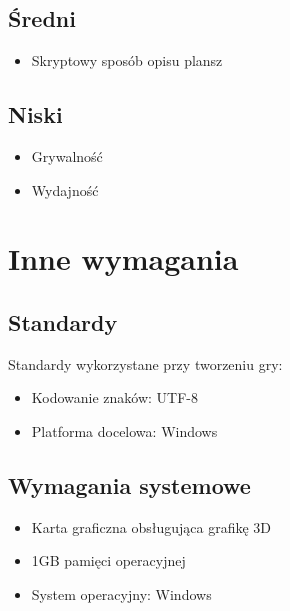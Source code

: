 \documentclass[12pt,a4paper,twoside]{article}
\begin{document}
\subsection{Średni}
\begin{itemize}
\item Skryptowy sposób opisu plansz
\end{itemize}
\subsection{Niski}
\begin{itemize}
\item Grywalność
\item Wydajność
\end{itemize}

\section{Inne wymagania}


\subsection{Standardy}


Standardy wykorzystane przy tworzeniu gry:
\begin{itemize}
\item Kodowanie znaków: UTF-8
\item Platforma docelowa: Windows
\end{itemize}

\subsection{Wymagania systemowe}

\begin{itemize}
\item Karta graficzna obsługująca grafikę 3D
\item 1GB pamięci operacyjnej
\item System operacyjny: Windows
\end{itemize}
\end{document}
